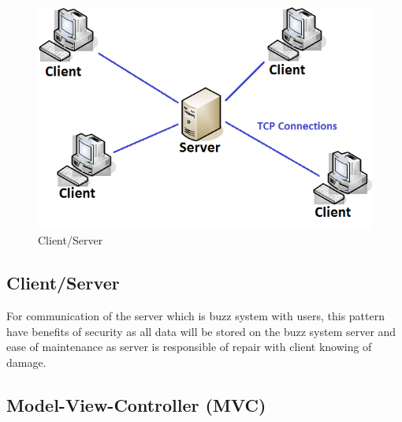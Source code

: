 \begin{figure}[H]	
\graphicspath{ {images/} }
    	\includegraphics[scale=0.5]{csp.png}
    	\caption{Client/Server}
	\end{figure}
	
\subsection*{Client/Server} 
For communication of the server which is buzz system with users, this pattern have benefits of security as all data will be stored on the buzz system server and ease of maintenance as server is responsible of repair with client knowing of damage.


\subsection*{Model-View-Controller (MVC)}

